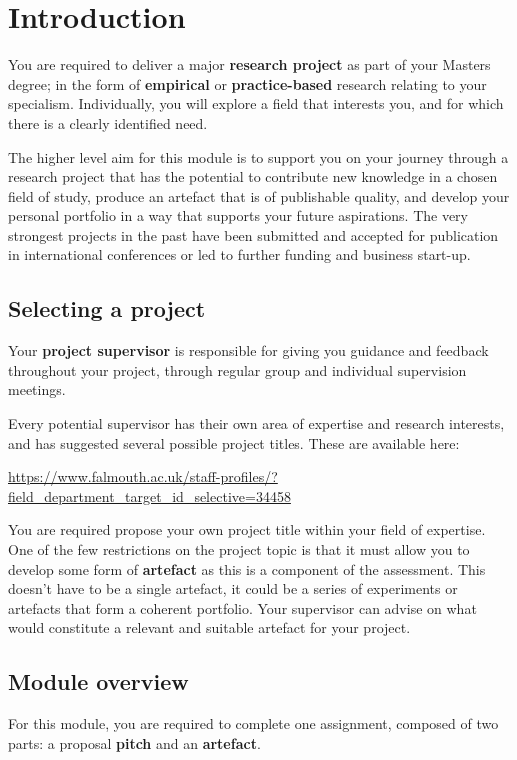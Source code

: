 \chapter{Introduction}

You are required to deliver a major \textbf{research project} as part of your Masters degree; in the form of \textbf{empirical} or \textbf{practice-based} research relating to your specialism. Individually, you will explore a field that interests you, and for which there is a clearly identified need.

The higher level aim for this module is to support you on your journey through a research project that has the potential to contribute new knowledge in a chosen field of study, produce an artefact that is of publishable quality, and develop your personal portfolio in a way that supports your future aspirations. The very strongest projects in the past have been submitted and accepted for publication in international conferences or led to further funding and business start-up.

\section*{Selecting a project}

Your \textbf{project supervisor} is responsible for giving you guidance and feedback throughout your project, through regular group and individual supervision meetings.

Every potential supervisor has their own area of expertise and research interests, and has suggested several possible project titles. These are available here:

\url{https://www.falmouth.ac.uk/staff-profiles/?field_department_target_id_selective=34458}

You are required propose your own project title within your field of expertise. One of the few restrictions on the project topic is that it must allow you to develop some form of \textbf{artefact} as this is a component of the assessment. This doesn't have to be a single artefact, it could be a series of experiments or artefacts that form a coherent portfolio. Your supervisor can advise on what would constitute a relevant and suitable artefact for your project.

\section*{Module overview}

For this module, you are required to complete one assignment, composed of two parts: a proposal \textbf{pitch} and an \textbf{artefact}. 

